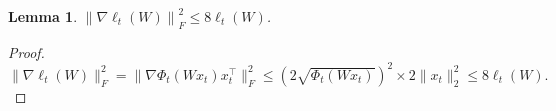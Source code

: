 \documentclass{article}
\newcommand{\nb}{\nabla}
\newcommand{\e}{\mathbf{e}}
\newcommand{\inner}[1]{ \left\langle {#1} \right\rangle }
\newcommand{\norm}[1]{\left\|{#1}\right\|}
\newtheorem{lemma}[theorem]{Lemma}
\begin{document}

\begin{lemma}
\label{lemma:bound_gradient}
$\norm{\nb\ell_t(W)}_F^2 \leq 8\ell_t(W)$. 
\end{lemma}
\begin{proof}
$    \|\nb\ell_t(W)\|_F^2 = \|\nb\Phi_t(Wx_t)x_t^\top\|_{F}^2 \leq \left(2\sqrt{\Phi_t(Wx_t)}\right)^2\times 2\|x_t\|_{2}^2 \leq 8\ell_t(W).  
$
\end{proof}
\end{document}
